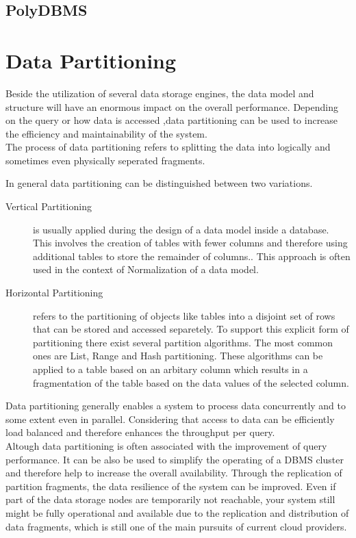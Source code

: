 \subsection{PolyDBMS}


\section{Data Partitioning}
\label{sec:part}

Beside the utilization of several data storage engines, the data model and structure 
will have an enormous impact on the overall performance. Depending on the query or 
how data is accessed ,data partitioning can be used to increase the efficiency and 
maintainability of the system\cite{Agrawal_2004}.\\
The process of data partitioning refers to splitting the data into logically and sometimes even
physically seperated fragments.

In general data partitioning can be distinguished between two variations.

\begin{description}
    \item [Vertical Partitioning] is usually applied during the design of a data model inside a 
    database. This involves the creation of tables with fewer columns and therefore using additional 
    tables to store the remainder of columns.\cite{vertical_1984}. This approach is often used in the 
    context of Normalization of a data model\cite{normalization_2012}. 
    \item [Horizontal Partitioning] refers to the partitioning of objects like tables 
    into a disjoint set of rows that can be stored and accessed separetely\cite{horizontal_1982}.
    To support this explicit form of partitioning there exist several partition algorithms.
    The most common ones are List, Range and Hash partitioning. These algorithms can be applied to a
    table based on an arbitary column which results in a fragmentation of the table 
    based on the data values of the selected column.
\end{description}

Data partitioning generally enables a system to process data concurrently and 
to some extent even in parallel. Considering that access to data can be 
efficiently load balanced and therefore enhances the throughput per query.\\

Altough data partitioning is often associated with the improvement of query performance.
It can be also be used to simplify the operating of a DBMS cluster and therefore help 
to increase the overall availability.
Through the replication of partition fragments, the data resilience of the system
can be improved. Even if part of the data storage nodes are temporarily not 
reachable, your system still might be fully operational and available due to the 
replication and distribution of data fragments, which is still one of the main 
pursuits of current cloud providers\cite{dbre2017}.

